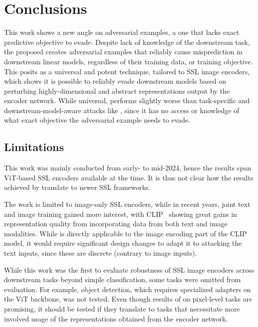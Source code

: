 \chapter{Conclusions}
\label{chap:conclusions}

This work shows a new angle on adversarial examples, a one that lacks exact predictive objective to evade. Despite lack of knowledge of the downstream task, the proposed \EmbedAttack creates adversarial examples that reliably cause misprediction in downstream linear models, regardless of their training data, or training objective. This posits \EmbedAttack as a universal and potent technique, tailored to SSL image encoders, which shows it is possible to reliably evade downstream models based on perturbing highly-dimensional and abstract representations output by the encoder network. While universal, \EmbedAttack performs slightly worse than task-specific and downstream-model-aware attacks like \DepthPGD, since it has no access or knowledge of what exact objective the adversarial example needs to evade. 

\section{Limitations}

This work was mainly conducted from early- to mid-2024, hence the results span ViT-based SSL encoders available at the time. It is thus not clear how the results achieved by \EmbedAttack translate to newer SSL frameworks. 

The work is limited to image-only SSL encoders, while in recent years, joint text and image training gained more interest, with CLIP~\cite{clip} showing great gains in representation quality from incorporating data from both text and image modalities. While \EmbedAttack is directly applicable to the image encoding part of the CLIP model, it would require significant design changes to adapt it to attacking the text inputs, since these are discrete (contrary to image inputs).

While this work was the first to evaluate robustness of SSL image encoders across downstream tasks beyond simple classification, some tasks were omitted from evaluation. For example, object detection, which requires specialized adapters on the ViT backbone, was not tested. Even though results of \EmbedAttack on pixel-level tasks are promising, it should be tested if they translate to tasks that necessitate more involved usage of the representations obtained from the encoder network.

